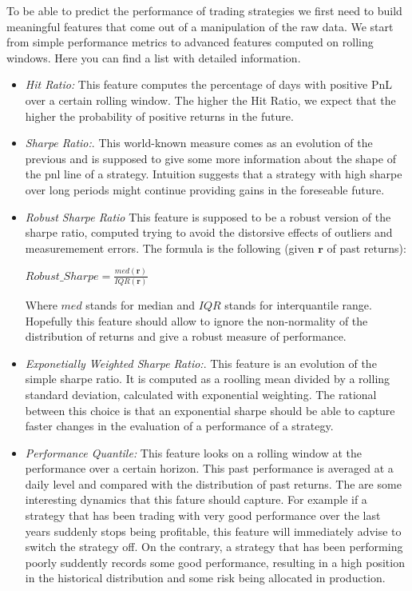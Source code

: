 \documentclass[a4paper]{article}
\begin{document}
To be able to predict the performance of trading strategies we first need to build meaningful features that come out of a manipulation of the raw data. We start from simple performance metrics to advanced features computed on rolling windows. Here you can find a list with detailed information.

\begin{itemize} 
	\item \textit{Hit Ratio:} This feature computes the percentage of days with positive PnL over a certain rolling window. The higher the Hit Ratio, we expect that the higher the probability of positive returns in the future.\\ 
	
	\item \textit{Sharpe Ratio:}. This world-known measure comes as an evolution of the previous and is supposed to give some more information about the shape of the pnl line of a strategy. Intuition suggests that a strategy with high sharpe over long periods might continue providing gains in the foreseable future.\\
	
	\item \textit{Robust Sharpe Ratio} This feature is supposed to be a robust version of the sharpe ratio, computed trying to avoid the distorsive effects of outliers and measuremement errors. The formula is the following (given $\mathbf{r}$ of past returns):
	
		\begin{center} 
			$\displaystyle Robust\_Sharpe =  \frac{med(\mathbf{r})}{IQR(\mathbf{r})}$
		\end{center}
		
	Where $med$ stands for median and $IQR$ stands for interquantile range. Hopefully this feature should allow to ignore the non-normality of the distribution of returns and give a robust measure of performance.\\
	
	\item \textit{Exponetially Weighted Sharpe Ratio:}. This feature is an evolution of the simple sharpe ratio. It is computed as a roolling mean divided by a rolling standard deviation, calculated with exponential weighting. The rational between this choice is that an exponential sharpe should be able to capture faster changes in the evaluation of a performance of a strategy.\\
	
	  
	\item \textit{Performance Quantile:} This feature looks on a rolling window at the performance over a certain horizon. This past performance is averaged at a daily level and compared with the distribution of past returns. The are some interesting dynamics that this fature should capture. For example if a strategy that has been trading with very good performance over the last years suddenly stops being profitable, this feature will immediately advise to switch the strategy off. On the contrary, a strategy that has been performing poorly suddently records some good performance, resulting in a high position in the historical distribution and some risk being allocated in production.\\   


\end{itemize}
\end{document}
